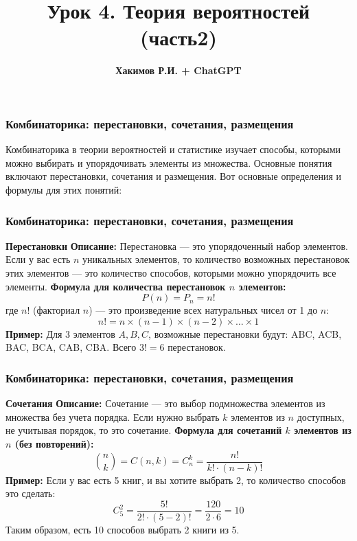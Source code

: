\documentclass[aspectratio=169]{beamer}
\title{\bf Урок 4. Теория вероятностей (часть2)}
\author{{\bf Хакимов Р.И. + ChatGPT}}
\date[\today]{}
\begin{document}
\begin{frame}
\titlepage
\end{frame}

\begin{frame}
\frametitle{Комбинаторика: перестановки, сочетания, размещения}
Комбинаторика в теории вероятностей и статистике изучает способы, которыми можно выбирать и упорядочивать элементы из множества. Основные понятия включают перестановки, сочетания и размещения. Вот основные определения и формулы для этих понятий:
\end{frame}

\begin{frame}
\frametitle{Комбинаторика: перестановки, сочетания, размещения}
\textbf{Перестановки}
\newline
\textbf{Описание:} Перестановка — это упорядоченный набор элементов. Если у вас есть \( n \) уникальных элементов, то количество возможных перестановок этих элементов — это количество способов, которыми можно упорядочить все элементы.
\newline
\textbf{Формула для количества перестановок \( n \) элементов:}
  \[
  P(n) = P_n = n!
  \]
где \( n! \) (факториал \( n \)) — это произведение всех натуральных чисел от 1 до \( n \):
  \[
  n! = n \times (n-1) \times (n-2) \times \ldots \times 1
  \]
\newline
\textbf{Пример:} Для 3 элементов \( A, B, C \), возможные перестановки будут: ABC, ACB, BAC, BCA, CAB, CBA. Всего \( 3! = 6 \) перестановок.
\end{frame}

\begin{frame}
\frametitle{Комбинаторика: перестановки, сочетания, размещения}
\textbf{Сочетания}
\newline
\textbf{Описание:} Сочетание — это выбор подмножества элементов из множества без учета порядка. Если нужно выбрать \( k \) элементов из \( n \) доступных, не учитывая порядок, то это сочетание.
\newline
\textbf{Формула для сочетаний \( k \) элементов из \( n \) (без повторений):}
  \[
  \binom{n}{k} = C(n, k) = C_n^k = \frac{n!}{k! \cdot (n - k)!}
  \]
\textbf{Пример:} Если у вас есть 5 книг, и вы хотите выбрать 2, то количество способов это сделать:
  \[
  C_5^2 = \frac{5!}{2! \cdot (5 - 2)!} = \frac{120}{2 \cdot 6} = 10
  \]
Таким образом, есть 10 способов выбрать 2 книги из 5.
\end{frame}
\end{document}
